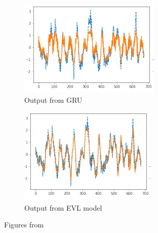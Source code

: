 \begin{figure}[h!]
  \centering
  \begin{subfigure}[b]{0.5\textwidth}
    \centering
    \caption{Output from GRU}
    \label{fig:evl-example1}
    \includegraphics[width=\textwidth]{./figs/illustrations/evl_example1.png}
    \hfill
  \end{subfigure}

  \begin{subfigure}[b]{0.5\textwidth}
    \centering
    \caption{Output from EVL model}
    \label{fig:evl-example2}
    \includegraphics[width=\textwidth]{./figs/illustrations/evl_example2.png}
    \hfill
  \end{subfigure}
  \caption{Figures from \cite{Ding2019}}
  \label{fig:evl}
\end{figure}